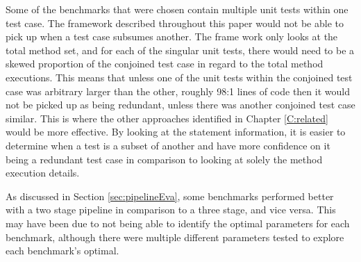 Some of the benchmarks that were chosen contain multiple unit tests within one test case. The framework described throughout this paper would not be able to pick up when a test case subsumes another. The frame work only looks at the total method set, and for each of the singular unit tests, there would need to be a skewed proportion of the conjoined test case in regard to the total method executions. This means that unless one of the unit tests within the conjoined test case was arbitrary larger than the other, roughly 98:1 lines of code then it would not be picked up as being redundant, unless there was another conjoined test case similar. This is where the other approaches identified in Chapter \ref{C:related} would be more effective. By looking at the statement information, it is easier to determine when a test is a subset of another and have more confidence on it being a redundant test case in comparison to looking at solely the method execution details. 

As discussed in Section \ref{sec:pipelineEva}, some benchmarks performed better with a two stage pipeline in comparison to a three stage, and vice versa. This may have been due to not being able to identify the optimal parameters for each benchmark, although there were multiple different parameters tested to explore each benchmark's optimal. 